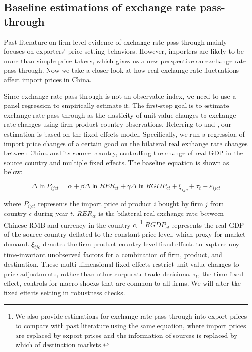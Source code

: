 \documentclass[12pt]{article}
\begin{document}
\subsection{Baseline estimations of exchange rate pass-through} \label{Empirical-Baseline}

Past literature on firm-level evidence of exchange rate pass-through mainly focuses on exporters' price-setting behaviors. However, importers are likely to be more than simple price takers, which gives us a new perspective on exchange rate pass-through. Now we take a closer look at how real exchange rate fluctuations affect import prices in China.

Since exchange rate pass-through is not an observable index, we need to use a panel regression to empirically estimate it. The first-step goal is to estimate exchange rate pass-through as the elasticity of unit value changes to exchange rate changes using firm-product-country observations. Referring to \cite{aik2014} and \cite{lmx2015}, our estimation is based on the fixed effects model. Specifically, we run a regression of import price changes of a certain good on the bilateral real exchange rate changes between China and its source country, controlling the change of real GDP in the source country and multiple fixed effects. The baseline equation is shown as below:

\begin{equation}
	\Delta \ln P_{i j c t}=\alpha+\beta \Delta \ln R E R_{c t}+\gamma \Delta \ln R G D P_{c t}+\xi_{i j c}+\tau_{t}+\varepsilon_{i j c t}
	\label{eq.baseline}
\end{equation}

where $P_{ijct}$ represents the import price of product $i$ bought by firm $j$ from country $c$ during year $t$. $R E R_{c t}$ is the bilateral real exchange rate between Chinese RMB and currency in the country $c$. \footnote{We also provide estimations for exchange rate pass-through into export prices to compare with past literature using the same equation, where import prices are replaced by export prices and the information of sources is replaced by which of destination markets.} $RGDP_{ct}$ represents the real GDP of the source country deflated to the constant price level, which proxy for market demand. $\xi_{ijc}$ denotes the firm-product-country level fixed effects to capture any time-invariant unobserved factors for a combination of firm, product, and destination. These multi-dimensional fixed effects restrict unit value changes to price adjustments, rather than other corporate trade decisions. $\tau_t$, the time fixed effect, controls for macro-shocks that are common to all firms. We will alter the fixed effects setting in robustness checks.
\end{document}
